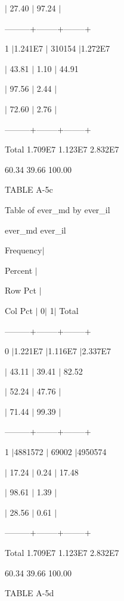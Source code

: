 \begin{multicols}{2}
\textsf{$\vert $ 27.40 $\vert $ 97.24 $\vert $}

\textsf{---------+--------+--------+}

\textsf{1 $\vert $1.241E7 $\vert $ 310154 $\vert $1.272E7}

\textsf{$\vert $ 43.81 $\vert $ 1.10 $\vert $ 44.91}

\textsf{$\vert $ 97.56 $\vert $ 2.44 $\vert $}

\textsf{$\vert $ 72.60 $\vert $ 2.76 $\vert $}

\textsf{---------+--------+--------+}

\textsf{Total 1.709E7 1.123E7 2.832E7}

\textsf{60.34 39.66 100.00}

\textsf{TABLE A-5c}





\textsf{Table of ever{\_}md by ever{\_}il}

\textsf{ever{\_}md ever{\_}il}

\textsf{Frequency$\vert $}

\textsf{Percent $\vert $}

\textsf{Row Pct $\vert $}

\textsf{Col Pct $\vert $ 0$\vert $ 1$\vert $ Total}

\textsf{---------+--------+--------+}

\textsf{0 $\vert $1.221E7 $\vert $1.116E7 $\vert $2.337E7}

\textsf{$\vert $ 43.11 $\vert $ 39.41 $\vert $ 82.52}

\textsf{$\vert $ 52.24 $\vert $ 47.76 $\vert $}

\textsf{$\vert $ 71.44 $\vert $ 99.39 $\vert $}

\textsf{---------+--------+--------+}

\textsf{1 $\vert $4881572 $\vert $ 69002 $\vert $4950574}

\textsf{$\vert $ 17.24 $\vert $ 0.24 $\vert $ 17.48}

\textsf{$\vert $ 98.61 $\vert $ 1.39 $\vert $}

\textsf{$\vert $ 28.56 $\vert $ 0.61 $\vert $}

\textsf{---------+--------+--------+}

\textsf{Total 1.709E7 1.123E7 2.832E7}

\textsf{60.34 39.66 100.00}





\textsf{TABLE A-5d}






\end{multicols}
